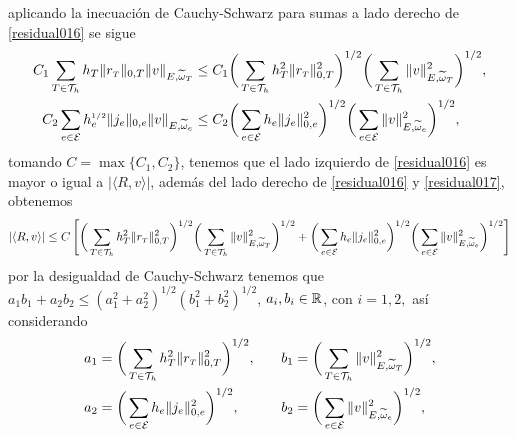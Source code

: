 aplicando la inecuaci\'on de Cauchy-Schwarz para sumas a lado derecho de \eqref{residual016} se sigue 
\begin{equation}\label{residual017}
\begin{split}
C_{1}\sum_{T\in{\ensuremath{\mathcal{T}}}_{h}} h_{T} \|r_{\text{\tiny $T$}}\|_{0,T} \| v\|_{E,\widetilde{\omega}_{T}}&\leq C_{1} \bigg( \sum_{T\in{\ensuremath{\mathcal{T}}}_{h}} h^{2}_{T}\| r_{\text{\tiny $T$}} \|^{2}_{0,T} \bigg)^{1/2} \bigg( \sum_{T\in {\ensuremath{\mathcal{T}}}_{h}} \|v\|^{2}_{E,\widetilde{\omega}_{T}} \bigg)^{1/2},\\
C_{2}\sum_{e\in {\ensuremath{\mathcal{E}}}}h^{\text{\tiny $1/2$}}_{e}\|j_{e}\|_{0,e}\| v\|_{E,\widetilde{\omega}_{e}}&\leq C_{2}\bigg( \sum_{e\in {\ensuremath{\mathcal{E}}}} h_{e}\|j_{e}\|^{2}_{0,e} \bigg)^{1/2} \bigg( \sum_{e\in {\ensuremath{\mathcal{E}}}}\|v\|^{2}_{E,\widetilde{\omega}_{e}} \bigg)^{1/2}, 
\end{split}
\end{equation}
tomando $C=\max\{C_{1},C_{2}\}$, tenemos que el lado izquierdo de \eqref{residual016} es mayor o igual a $|\langle R,v \rangle|$, adem\'as del lado derecho de  \eqref{residual016} y \eqref{residual017}, obtenemos 
\begin{equation}
\begin{split}
|\langle R,v \rangle|\leq C\left[ \bigg( \sum_{T\in{\ensuremath{\mathcal{T}}}_{h}} h^{2}_{T}\|r_{\text{\tiny $T$}}\|^{2}_{0,T} \bigg)^{1/2} \bigg( \sum_{T\in {\ensuremath{\mathcal{T}}}_{h}} \|v\|^{2}_{E,\widetilde{\omega}_{T}} \bigg)^{1/2} + \bigg( \sum_{e\in {\ensuremath{\mathcal{E}}}} h_{e}\|j_{e}\|^{2}_{0,e} \bigg)^{1/2} \bigg( \sum_{e\in {\ensuremath{\mathcal{E}}}}\|v\|^{2}_{E,\widetilde{\omega}_{e}} \bigg)^{1/2}  \right]
\end{split}
\end{equation}
por la desigualdad de Cauchy-Schwarz tenemos que $a_{1}b_{1} + a_{2}b_{2} \leq (a^{2}_{1} + a^{2}_{2})^{1/2}(b^{2}_{1} + b^{2}_{2})^{1/2}$, $a_{i},b_{i}\in {\ensuremath{\mathbb{R}}}$, con $i=1,2,$ as\'i considerando 
\begin{equation*}
\begin{aligned}
a_{1}&= \bigg( \sum_{T\in{\ensuremath{\mathcal{T}}}_{h}} h^{2}_{T}\| r_{\text{\tiny $T$}} \|^{2}_{0,T} \bigg)^{1/2},\\  a_{2} &=\bigg( \sum_{e\in {\ensuremath{\mathcal{E}}}} h_{e}\|j_{e}\|^{2}_{0,e} \bigg)^{1/2},
\end{aligned}
\qquad
\begin{aligned}
b_{1}&=\bigg( \sum_{T\in {\ensuremath{\mathcal{T}}}_{h}} \|v\|^{2}_{E,\widetilde{\omega}_{T}} \bigg)^{1/2},\\
b_{2}&=\bigg( \sum_{e\in {\ensuremath{\mathcal{E}}}}\|v\|^{2}_{E,\widetilde{\omega}_{e}} \bigg)^{1/2},
\end{aligned}
\end{equation*}
